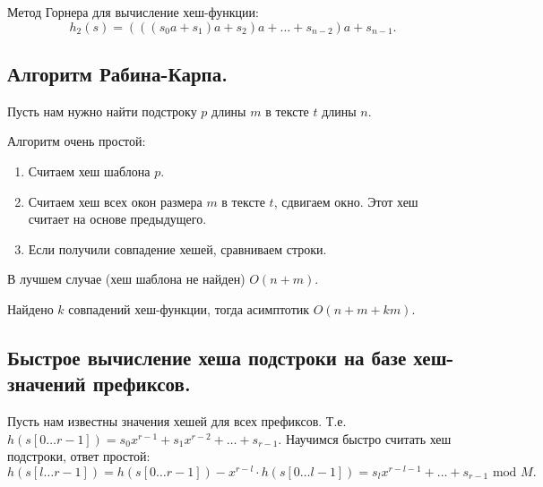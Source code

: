 Метод Горнера для вычисление хеш-функции:
\[
  h_2(s) = \left( \left( \left( s_0 a + s_1 \right)a + s_2  \right)a + \ldots + s_{n-2}  \right) a + s_{n-1} 
.\] 
\subsection{Алгоритм Рабина-Карпа.}
Пусть нам нужно найти подстроку $p$ длины $m$ в тексте $t$ длины $n$.

Алгоритм очень простой:
\begin{enumerate}
  \item Считаем хеш шаблона $p$.
  \item Считаем хеш всех окон размера $m$ в тексте $t$, сдвигаем окно. Этот хеш считает на основе
    предыдущего.
  \item Если получили совпадение хешей, сравниваем строки.
\end{enumerate}

В лучшем случае (хеш шаблона не найден) $O(n + m)$.

Найдено $k$ совпадений хеш-функции, тогда асимптотик $O(n + m + km)$.

\subsection{Быстрое вычисление хеша подстроки на базе хеш-значений префиксов.}
Пусть нам известны значения хешей для всех префиксов.
Т.е. $h(s[0 \ldots r -1]) = s_0 x^{r-1} + s_1 x^{r-2} + \ldots + s_{r-1}$.
Научимся быстро считать хеш подстроки, ответ простой:
\[
  h(s[l\ldots r - 1]) = h(s[0\ldots r-1]) - x^{r-l} \cdot h(s[0\ldots l-1]) = s_{l} x^{r - l - 1} + \ldots + 
  s_{r - 1} \textrm{ mod } M
.\] 


